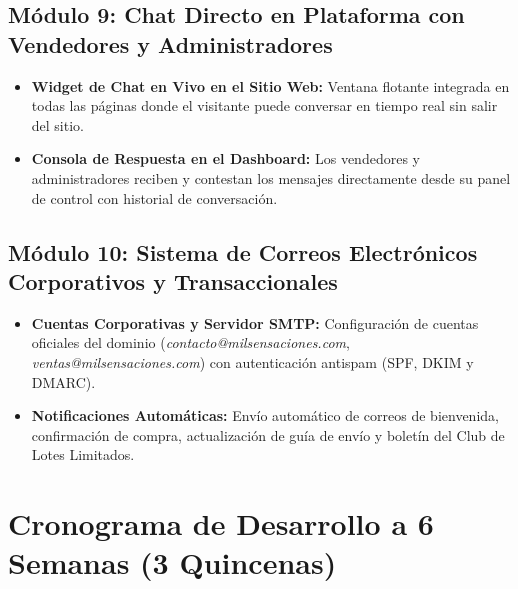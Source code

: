 \documentclass[11pt,letterpaper]{article}
\begin{document}
\subsection{Módulo 9: Chat Directo en Plataforma con Vendedores y Administradores}
\begin{itemize}[leftmargin=1.5cm]
    \item \textbf{Widget de Chat en Vivo en el Sitio Web:} Ventana flotante integrada en todas las páginas donde el visitante puede conversar en tiempo real sin salir del sitio.
    \item \textbf{Consola de Respuesta en el Dashboard:} Los vendedores y administradores reciben y contestan los mensajes directamente desde su panel de control con historial de conversación.
\end{itemize}

\subsection{Módulo 10: Sistema de Correos Electrónicos Corporativos y Transaccionales}
\begin{itemize}[leftmargin=1.5cm]
    \item \textbf{Cuentas Corporativas y Servidor SMTP:} Configuración de cuentas oficiales del dominio (\textit{contacto@milsensaciones.com}, \textit{ventas@milsensaciones.com}) con autenticación antispam (SPF, DKIM y DMARC).
    \item \textbf{Notificaciones Automáticas:} Envío automático de correos de bienvenida, confirmación de compra, actualización de guía de envío y boletín del Club de Lotes Limitados.
\end{itemize}

\section{Cronograma de Desarrollo a 6 Semanas (3 Quincenas)}
\end{document}
